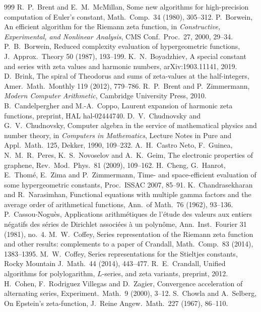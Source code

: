 \documentclass[11pt,reqno]{amsart}
\theoremstyle{definition}
\theoremstyle{remark}
\begin{document}
\begin{thebibliography}{999}
 R.~P.~Brent and E.~M.~McMillan, Some new algorithms for high-precision computation of Euler's constant, Math.\ Comp.\ 34 (1980), 305--312.
 P.~Borwein, An efficient algorithm for the Riemann zeta function, in \emph{Constructive, Experimental, and Nonlinear Analysis}, CMS Conf.\ Proc.\ 27, 2000, 29--34.
 P.~B.~Borwein, Reduced complexity evaluation of hypergeometric functions, J.\ Approx.\ Theory 50 (1987), 193--199.
 K.~N.~Boyadzhiev, A special constant and series with zeta values and harmonic numbers, arXiv:1903.11141, 2019.
 D.~Brink, The spiral of Theodorus and sums of zeta-values at the half-integers, Amer.\ Math.\ Monthly 119 (2012), 779--786.
 R.~P.~Brent and P.~Zimmermann, \emph{Modern Computer Arithmetic}, Cambridge University Press, 2010.
 B.~Candelpergher and M.-A.~Coppo, Laurent expansion of harmonic zeta functions, preprint, HAL hal-02444740.
 D.~V.~Chudnovsky and G.~V.~Chudnovsky, Computer algebra in the service of mathematical physics and number theory, in \emph{Computers in Mathematics}, Lecture Notes in Pure and Appl.\ Math.\ 125, Dekker, 1990, 109--232.
 A.~H.~Castro Neto, F.~Guinea, N.~M.~R.~Peres, K.~S.~Novoselov and A.~K.~Geim, The electronic
properties of graphene, Rev.\ Mod.\ Phys.\ 81 (2009), 109--162.
 H.~Cheng, G.~Hanrot, E.~Thom\'e, E.~Zima and P.~Zimmermann, Time- and space-efficient evaluation of some hypergeometric constants, Proc.\ ISSAC 2007, 85--91.
 K.~Chandrasekharan and R.~Narasimhan, Functional equations with multiple gamma factors and the average order of arithmetical functions, Ann.\ of Math.\ 76 (1962), 93--136.
 P.~Cassou-Nogu\`es, Applications arithm\'etiques de l'\'etude des valeurs aux entiers n\'egatifs des s\'eries de Dirichlet associ\'ees \`a un polyn\^ome, Ann.\ Inst.\ Fourier 31 (1981), no.~4.
 M.~W.~Coffey, Series representation of the Riemann zeta function and other results: complements to a paper of Crandall, Math.\ Comp.\ 83 (2014), 1383--1395.
 M.~W.~Coffey, Series representations for the Stieltjes constants, Rocky Mountain J.\ Math.\ 44 (2014), 443--477.
 R.~E.~Crandall, Unified algorithms for polylogarithm, $L$-series, and zeta variants, preprint, 2012.
 H.~Cohen, F.~Rodriguez Villegas and D.~Zagier, Convergence acceleration of alternating series, Experiment.\ Math.\ 9 (2000), 3--12.
 S.~Chowla and A.~Selberg, On Epstein's zeta-function, J.\ Reine Angew.\ Math.\ 227 (1967), 86--110.

\end{thebibliography}
\end{document}
